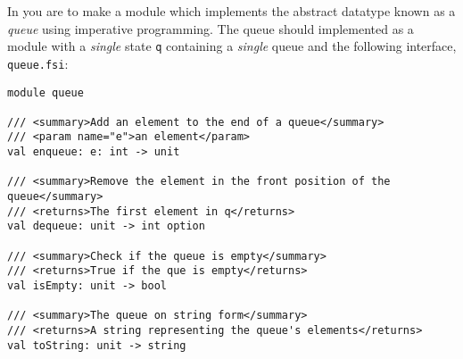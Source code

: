 In you are to make a module which implements the abstract datatype known as a \emph{queue} using imperative programming. The queue should implemented as a module with a \emph{single} state \lstinline{q} containing a \emph{single} queue and the following interface, \lstinline[language=console]{queue.fsi}:
\begin{lstlisting}
module queue

/// <summary>Add an element to the end of a queue</summary>
/// <param name="e">an element</param>
val enqueue: e: int -> unit

/// <summary>Remove the element in the front position of the queue</summary>
/// <returns>The first element in q</returns>
val dequeue: unit -> int option

/// <summary>Check if the queue is empty</summary>
/// <returns>True if the que is empty</returns>
val isEmpty: unit -> bool

/// <summary>The queue on string form</summary>
/// <returns>A string representing the queue's elements</returns>
val toString: unit -> string
\end{lstlisting}
